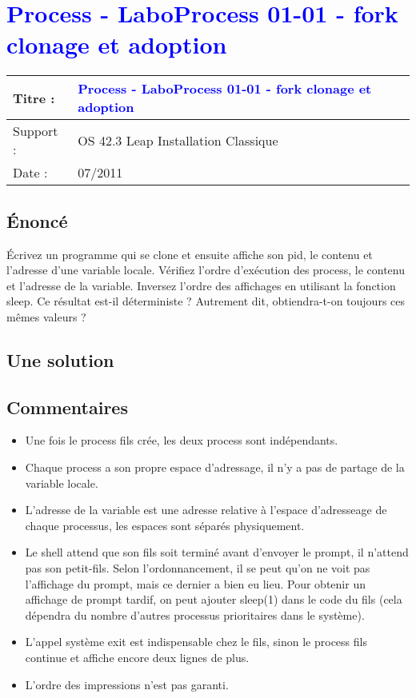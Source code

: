 \lstset{language=c}
\renewcommand{\titre}{\textcolor{blue}{ Process - LaboProcess 01-01 - fork  clonage et adoption }}

\lhead{ \titre }
\section{{\titre} }

\begin{tabular}{|l|l|}
\hline
Titre : 	& \titre \\\hline
Support : 	& OS 42.3 Leap Installation Classique \\\hline
Date :		& 07/2011 \\\hline
\end{tabular}

\subsection{Énoncé}

Écrivez un programme qui se clone et ensuite affiche son pid, le contenu et l'adresse d'une variable locale. Vérifiez l'ordre d'exécution des process, le contenu et l'adresse de la variable. Inversez l'ordre des affichages en utilisant la fonction sleep. Ce résultat est-il déterministe ? Autrement dit, obtiendra-t-on toujours ces mêmes valeurs ?

\subsection{Une solution}



\subsection{Commentaires}

\begin{itemize}
\item Une fois le process fils crée, les deux process sont indépendants. 
\item Chaque process a son propre espace d'adressage, il n'y a pas de partage de la variable locale.
\item L'adresse de la variable est une adresse relative à l'espace d'adresseage de chaque processus, les espaces sont séparés physiquement.
\item Le shell attend que son fils soit terminé avant d'envoyer le prompt, il n'attend pas son petit-fils. Selon l'ordonnancement, il se peut qu'on ne voit pas l'affichage du prompt, mais ce dernier a bien eu lieu. Pour obtenir un affichage de prompt tardif, on peut ajouter sleep(1) dans le code du fils (cela dépendra du nombre d'autres processus prioritaires dans le système).
\item L'appel système exit est indispensable chez le fils, sinon le process fils continue et affiche encore deux lignes de plus. 
\item L'ordre des impressions n'est pas garanti.
\end{itemize}
